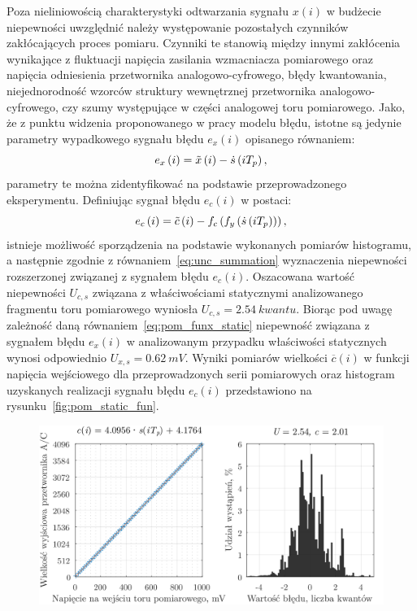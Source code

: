 Poza nieliniowością charakterystyki odtwarzania sygnału $x(i)$ w budżecie niepewności uwzględnić należy występowanie pozostałych czynników zakłócających proces pomiaru. Czynniki te stanowią między innymi zakłócenia wynikające z fluktuacji napięcia zasilania wzmacniacza pomiarowego oraz napięcia odniesienia przetwornika analogowo-cyfrowego, błędy kwantowania, niejednorodność wzorców struktury wewnętrznej przetwornika analogowo-cyfrowego, czy szumy występujące w części analogowej toru pomiarowego. Jako, że z punktu widzenia proponowanego w pracy modelu błędu, istotne są jedynie parametry wypadkowego sygnału błędu $e_{x}(i)$ opisanego równaniem:
\begin{equation}
e_{x} \left(i\right) = \tilde{x} \left(i\right) - \dot{s} \left(iT_{p}\right) \label{eq:pom_funx_error},
\end{equation}
parametry te można zidentyfikować na podstawie przeprowadzonego eksperymentu. Definiując sygnał błędu $e_{c}(i)$ w postaci:
\begin{equation}
e_{c} \left(i\right) = \tilde{c} \left(i\right) - f_{c} \left(f_{y} \left(\dot{s} \left(iT_{p}\right)\right)\right) \label{eq:pom_func_error},
\end{equation}
istnieje możliwość sporządzenia na podstawie wykonanych pomiarów histogramu, a następnie zgodnie z równaniem~\eqref{eq:unc_summation} wyznaczenia niepewności rozszerzonej związanej z sygnałem błędu $e_{c}(i)$. Oszacowana wartość niepewności $U_{c,s}$ związana z właściwościami statycznymi analizowanego fragmentu toru pomiarowego wyniosła $U_{c,s} = \qty{2.54}{kwantu}$. Biorąc pod uwagę zależność daną równaniem~\eqref{eq:pom_funx_static} niepewność związana z sygnałem błędu $e_{x}(i)$ w analizowanym przypadku właściwości statycznych wynosi odpowiednio $U_{x,s} = \qty{0.62}{mV}$. Wyniki pomiarów wielkości $\overline{c}(i)$ w funkcji napięcia wejściowego dla przeprowadzonych serii pomiarowych oraz histogram uzyskanych realizacji sygnału błędu $e_{c}(i)$ przedstawiono na rysunku~\ref{fig:pom_static_fun}.

\begin{figure}[htb!]
\begin{center}
\includegraphics{obrazki/static_adcout}
\end{center}
\end{figure}

